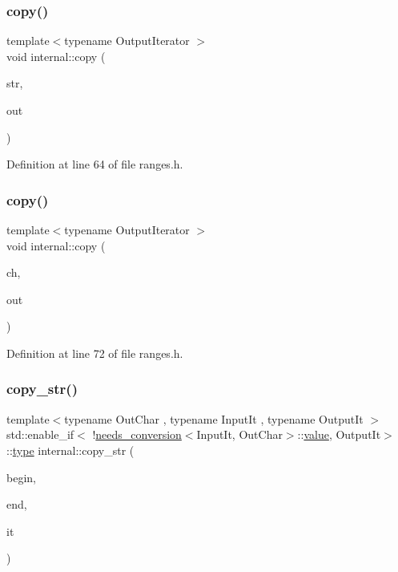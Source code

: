 \subsubsection{\texorpdfstring{copy()}{copy()}\hspace{0.1cm}{\footnotesize\ttfamily [2/3]}}
{\footnotesize\ttfamily template$<$typename Output\+Iterator $>$ \\
void internal\+::copy (\begin{DoxyParamCaption}\item[{const char $\ast$}]{str,  }\item[{Output\+Iterator}]{out }\end{DoxyParamCaption})}



Definition at line 64 of file ranges.\+h.

\mbox{\label{namespaceinternal_a3d05e3346c821a5dc90f1ea85ca6125e}} 
\subsubsection{\texorpdfstring{copy()}{copy()}\hspace{0.1cm}{\footnotesize\ttfamily [3/3]}}
{\footnotesize\ttfamily template$<$typename Output\+Iterator $>$ \\
void internal\+::copy (\begin{DoxyParamCaption}\item[{char}]{ch,  }\item[{Output\+Iterator}]{out }\end{DoxyParamCaption})}



Definition at line 72 of file ranges.\+h.

\mbox{\label{namespaceinternal_a8d09228af5e19a701d0d6372a036cf24}} 
\subsubsection{\texorpdfstring{copy\+\_\+str()}{copy\_str()}\hspace{0.1cm}{\footnotesize\ttfamily [1/2]}}
{\footnotesize\ttfamily template$<$typename Out\+Char , typename Input\+It , typename Output\+It $>$ \\
std\+::enable\+\_\+if$<$ !\hyperlink{structinternal_1_1needs__conversion}{needs\+\_\+conversion}$<$Input\+It, Out\+Char$>$\+::\hyperlink{classinternal_1_1value}{value}, Output\+It$>$\+::\hyperlink{namespaceinternal_a8661864098ac0acff9a6dd7e66f59038}{type} internal\+::copy\+\_\+str (\begin{DoxyParamCaption}\item[{Input\+It}]{begin,  }\item[{Input\+It}]{end,  }\item[{Output\+It}]{it }\end{DoxyParamCaption})}



